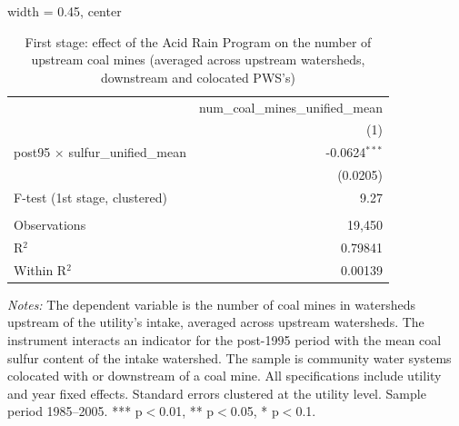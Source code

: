 
\begin{table}[htbp]
   
   \caption{\label{tab:fs_dwnstrmcolocate_minevio} First stage: effect of the Acid Rain Program on the number of upstream coal mines (averaged across upstream watersheds, downstream and colocated PWS's)}
   \bigskip
   
   \centering
   
   \begin{adjustbox}{width = 0.45\textwidth, center}
      
      
      \begin{tabular}{lr}
         \toprule
         
                                                  & num\_coal\_mines\_unified\_mean\\      
         
                                                  & (1)\\  
         
         \midrule 
         post95 $\times$ sulfur\_unified\_mean    & -0.0624$^{***}$\\   
                                                  & (0.0205)\\   
         
         F-test (1st stage, clustered)            & 9.27\\  
         
          \\
         
         Observations                             & 19,450\\  
         R$^2$                                    & 0.79841\\  
         Within R$^2$                             & 0.00139\\  
         
         \bottomrule
         
      \end{tabular}
      
      
      
   \end{adjustbox}
      {\tiny\linespread{1}\selectfont \par \raggedright 
   \textit{Notes:} The dependent variable is the number of coal mines in watersheds upstream of the utility's intake, averaged across upstream watersheds. The instrument interacts an indicator for the post-1995 period with the mean coal sulfur content of the intake watershed. The sample is community water systems colocated with or downstream of a coal mine. All specifications include utility and year fixed effects. Standard errors clustered at the utility level. Sample period 1985--2005. *** p$<$0.01, ** p$<$0.05, * p$<$0.1.}
   
\end{table}



